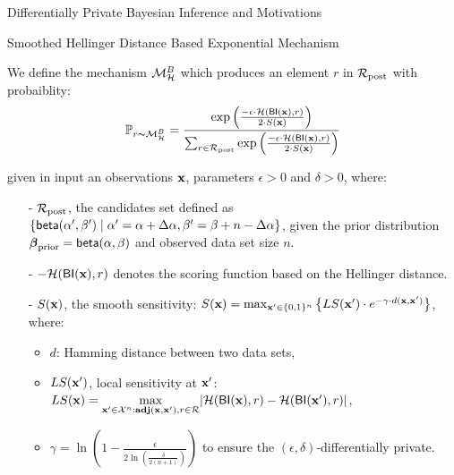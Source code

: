 \documentclass[final,hyperref={pdfpagelabels=false}]{beamer}
\begin{document}
\begin{frame}[t]
\begin{columns}[t]
\begin{column}{.485\textwidth}
\begin{block}{Differentially Private Bayesian Inference and Motivations}
\end{block}



\begin{block}{Smoothed Hellinger Distance Based Exponential Mechanism}

We define the mechanism $\mathcal{M}^{B}_{\mathcal{H}}$ which produces an element $r$ in $\mathcal{R}_{\textup{post}}$ with probaiblity:
\[
\mathbb{P}_{r \thicksim \mathcal{M}^{B}_{\mathcal{H}}} =
\frac 
{\exp \Big(\frac{-\epsilon\cdot\mathcal{H}(\mathsf{BI}(\textbf{x}),r)}{2\cdot S(\textbf{x})}\Big)}
{\sum_{r\in\mathcal{R}_{\textup{post}}} \exp \Big(\frac{-\epsilon\cdot\mathcal{H}(\mathsf{BI}(\textbf{x}),r)}{2\cdot S(\textbf{x})}\Big)}
\]

given in input an observations $\textbf{x}$, parameters $\epsilon>0$ and $\delta>0$, where:

\begin{itemize}
  \item[-] $\mathcal{R}_{\textup{post}}$, the candidates set defined as $\{\mathsf{beta}(\alpha',\beta')\mid \alpha'=\alpha+\Delta\alpha, \beta'=\beta+n-\Delta\alpha\}$, given the prior distribution $\boldsymbol{\beta}_{\textup{prior}}=\mathsf{beta}(\alpha, \beta)$ and observed data set size $n$.

  \item[-] $-\mathcal{H}(\mathsf{BI}(\textbf{x}),r)$ denotes the scoring function based on the Hellinger distance.

  \item[-] $S(\textbf{x})$, the smooth sensitivity\cite{nissim2007smooth}:
  $
  S(\textbf{x})=\max_{\textbf{x}' \in \{0,1\}^{n}}\big\{ LS(\textbf{x}') \cdot e^{-\gamma\cdot d(\textbf{x},\textbf{x}')}\big\}
  $,
  where:
  \begin{itemize}
   \item $d$: Hamming distance between two data sets,

   \item $LS(\textbf{x}')$, local sensitivity at $\textbf{x}'$:
   $
   LS(\textbf{x})=\max\limits_{\textbf{x}' \in \mathcal{X}^n:\textbf{adj}(\textbf{x},\textbf{x}'), r\in \mathcal{R}}\lvert \mathcal{H}(\mathsf{BI}(\textbf{x}), r) - \mathcal{H}(\mathsf{BI}(\textbf{x}'), r)\rvert
   $,

   \item $\gamma =   \ln(1 - \frac{\epsilon}{2 \ln (\frac{\delta}{2 (n + 1)})})$ to ensure the $(\epsilon,\delta)$-differentially private.
 \end{itemize}
\end{itemize}



\end{block}
\end{column}
\end{columns}
\end{frame}
\end{document}
